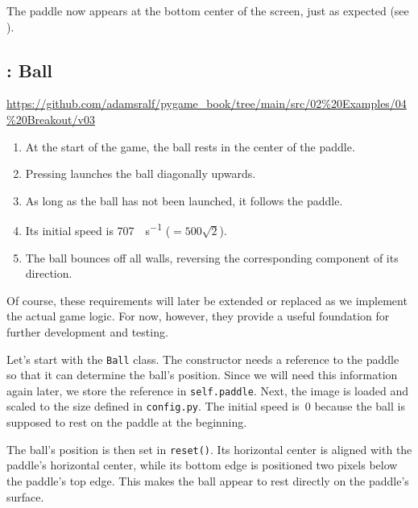 
The paddle now appears at the bottom center of the screen, just as expected (see ).


\subsection{: Ball}

\begin{diskbox}
	\url{https://github.com/adamsralf/pygame_book/tree/main/src/02%20Examples/04%20Breakout/v03}
\end{diskbox}


\begin{enumerate}
	\item At the start of the game, the ball rests in the center of the paddle.
	\item Pressing  launches the ball diagonally upwards.
	\item As long as the ball has not been launched, it follows the paddle.
	\item Its initial speed is \SI{707}{\pixel\per\second} ($=500\sqrt{2}$).
	\item The ball bounces off all walls, reversing the corresponding component of its direction.
\end{enumerate}
\er

\begin{hintbox}
	Of course, these requirements will later be extended or replaced as we implement the actual game logic. For now, however, they provide a useful foundation for further development and testing.
\end{hintbox}

Let's start with the \texttt{Ball} class. The constructor needs a reference to the paddle so that it can determine the ball's position. Since we will need this information again later, we store the reference in \texttt{self.paddle}. Next, the image is loaded and scaled to the size defined in \texttt{config.py}. The initial speed is~0 because the ball is supposed to rest on the paddle at the beginning.

The ball's position is then set in \texttt{reset()}. Its horizontal center is aligned with the paddle's horizontal center, while its bottom edge is positioned two pixels below the paddle's top edge. This makes the ball appear to rest directly on the paddle's surface.


